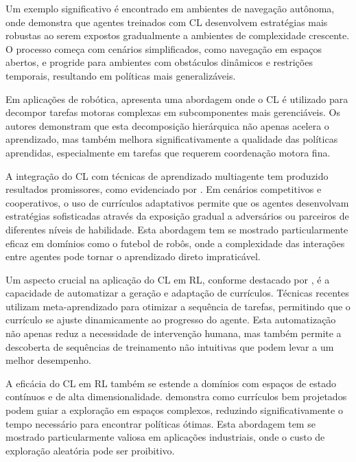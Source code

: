 Um exemplo significativo é encontrado em ambientes de navegação autônoma, onde \cite{automatic_curriculum_learning_survey, huggingface_curriculum} demonstra que agentes treinados com CL desenvolvem estratégias mais robustas ao serem expostos gradualmente a ambientes de complexidade crescente. O processo começa com cenários simplificados, como navegação em espaços abertos, e progride para ambientes com obstáculos dinâmicos e restrições temporais, resultando em políticas mais generalizáveis.

Em aplicações de robótica, \cite{curriculum} apresenta uma abordagem onde o CL é utilizado para decompor tarefas motoras complexas em subcomponentes mais gerenciáveis. Os autores demonstram que esta decomposição hierárquica não apenas acelera o aprendizado, mas também melhora significativamente a qualidade das políticas aprendidas, especialmente em tarefas que requerem coordenação motora fina.

A integração do CL com técnicas de aprendizado multiagente tem produzido resultados promissores, como evidenciado por \cite{curriculum_learning_in_rl}. Em cenários competitivos e cooperativos, o uso de currículos adaptativos permite que os agentes desenvolvam estratégias sofisticadas através da exposição gradual a adversários ou parceiros de diferentes níveis de habilidade. Esta abordagem tem se mostrado particularmente eficaz em domínios como o futebol de robôs, onde a complexidade das interações entre agentes pode tornar o aprendizado direto impraticável.

Um aspecto crucial na aplicação do CL em RL, conforme destacado por \cite{variational_curriculum_rl}, é a capacidade de automatizar a geração e adaptação de currículos. Técnicas recentes utilizam meta-aprendizado para otimizar a sequência de tarefas, permitindo que o currículo se ajuste dinamicamente ao progresso do agente. Esta automatização não apenas reduz a necessidade de intervenção humana, mas também permite a descoberta de sequências de treinamento não intuitivas que podem levar a um melhor desempenho.

A eficácia do CL em RL também se estende a domínios com espaços de estado contínuos e de alta dimensionalidade. \cite{curml} demonstra como currículos bem projetados podem guiar a exploração em espaços complexos, reduzindo significativamente o tempo necessário para encontrar políticas ótimas. Esta abordagem tem se mostrado particularmente valiosa em aplicações industriais, onde o custo de exploração aleatória pode ser proibitivo.

